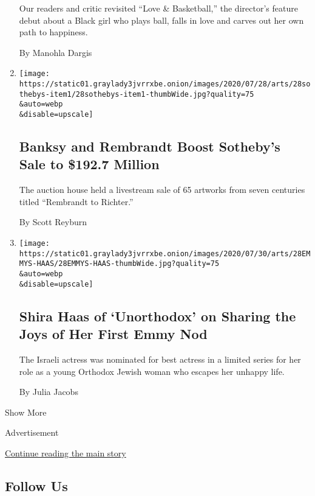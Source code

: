 \begin{enumerate}
  Our readers and critic revisited ``Love \& Basketball,'' the
  director's feature debut about a Black girl who plays ball, falls in
  love and carves out her own path to happiness.

  By Manohla Dargis
\item
  \href{/2020/07/28/arts/design/sothebys-banksy-rembrandt.html}{}

  \texttt{[image: https://static01.graylady3jvrrxbe.onion/images/2020/07/28/arts/28sothebys-item1/28sothebys-item1-thumbWide.jpg?quality=75\\\&auto=webp\\\&disable=upscale]}

  \hypertarget{banksy-and-rembrandt-boost-sothebys-sale-to-1927-million}{%
  \subsection{Banksy and Rembrandt Boost Sotheby's Sale to \$192.7
  Million}\label{banksy-and-rembrandt-boost-sothebys-sale-to-1927-million}}

  The auction house held a livestream sale of 65 artworks from seven
  centuries titled ``Rembrandt to Richter.''

  By Scott Reyburn
\item
  \href{/2020/07/28/arts/television/shira-haas-unorthodox-emmy-netflix.html}{}

  \texttt{[image: https://static01.graylady3jvrrxbe.onion/images/2020/07/30/arts/28EMMYS-HAAS/28EMMYS-HAAS-thumbWide.jpg?quality=75\\\&auto=webp\\\&disable=upscale]}

  \hypertarget{shira-haas-of-unorthodox-on-sharing-the-joys-of-her-first-emmy-nod}{%
  \subsection{Shira Haas of `Unorthodox' on Sharing the Joys of Her
  First Emmy
  Nod}\label{shira-haas-of-unorthodox-on-sharing-the-joys-of-her-first-emmy-nod}}

  The Israeli actress was nominated for best actress in a limited series
  for her role as a young Orthodox Jewish woman who escapes her unhappy
  life.

  By Julia Jacobs
\end{enumerate}

Show More

Advertisement

\protect\hyperlink{after-mid2}{Continue reading the main story}

\hypertarget{follow-us}{%
\subsection{Follow Us}\label{follow-us}}

